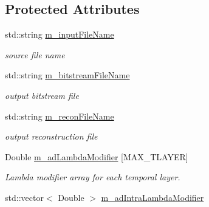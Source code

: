 \subsection*{Protected Attributes}
\begin{DoxyCompactItemize}
\item 
\mbox{\label{class_t_app_enc_cfg_ae294312b91b8f7b0fac41c02350f6413}} 
std\+::string \hyperlink{class_t_app_enc_cfg_ae294312b91b8f7b0fac41c02350f6413}{m\+\_\+input\+File\+Name}
\begin{DoxyCompactList}\small\item\em source file name \end{DoxyCompactList}\item 
\mbox{\label{class_t_app_enc_cfg_a910ab4bf6ecbd6c6794487f38c4eba2c}} 
std\+::string \hyperlink{class_t_app_enc_cfg_a910ab4bf6ecbd6c6794487f38c4eba2c}{m\+\_\+bitstream\+File\+Name}
\begin{DoxyCompactList}\small\item\em output bitstream file \end{DoxyCompactList}\item 
\mbox{\label{class_t_app_enc_cfg_a2e90ea3ad1b8adf03d0896377732d67c}} 
std\+::string \hyperlink{class_t_app_enc_cfg_a2e90ea3ad1b8adf03d0896377732d67c}{m\+\_\+recon\+File\+Name}
\begin{DoxyCompactList}\small\item\em output reconstruction file \end{DoxyCompactList}\item 
\mbox{\label{class_t_app_enc_cfg_a40489f9bbe52add29e27c6bd2426d122}} 
Double \hyperlink{class_t_app_enc_cfg_a40489f9bbe52add29e27c6bd2426d122}{m\+\_\+ad\+Lambda\+Modifier} \mbox{[}M\+A\+X\+\_\+\+T\+L\+A\+Y\+ER\mbox{]}
\begin{DoxyCompactList}\small\item\em Lambda modifier array for each temporal layer. \end{DoxyCompactList}\item 
\mbox{\label{class_t_app_enc_cfg_a2a3d64021563037e1673dd6a6aa7093d}} 
std\+::vector$<$ Double $>$ \hyperlink{class_t_app_enc_cfg_a2a3d64021563037e1673dd6a6aa7093d}{m\+\_\+ad\+Intra\+Lambda\+Modifier}

\end{DoxyCompactItemize}
